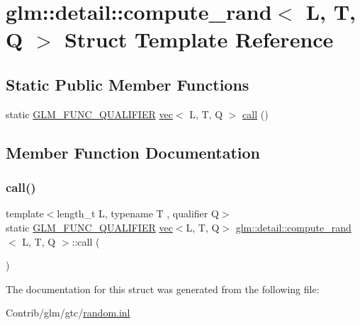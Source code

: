 \hypertarget{structglm_1_1detail_1_1compute__rand}{}\section{glm\+:\+:detail\+:\+:compute\+\_\+rand$<$ L, T, Q $>$ Struct Template Reference}
\label{structglm_1_1detail_1_1compute__rand}
\subsection*{Static Public Member Functions}
\begin{DoxyCompactItemize}
\item 
static \mbox{\hyperlink{setup_8hpp_a33fdea6f91c5f834105f7415e2a64407}{G\+L\+M\+\_\+\+F\+U\+N\+C\+\_\+\+Q\+U\+A\+L\+I\+F\+I\+ER}} \mbox{\hyperlink{structglm_1_1vec}{vec}}$<$ L, T, Q $>$ \mbox{\hyperlink{structglm_1_1detail_1_1compute__rand_a7c4855eeb77b83d066abf7ffc1398724}{call}} ()
\end{DoxyCompactItemize}


\subsection{Member Function Documentation}
\mbox{\label{structglm_1_1detail_1_1compute__rand_a7c4855eeb77b83d066abf7ffc1398724}} 
\subsubsection{\texorpdfstring{call()}{call()}}
{\footnotesize\ttfamily template$<$length\+\_\+t L, typename T , qualifier Q$>$ \\
static \mbox{\hyperlink{setup_8hpp_a33fdea6f91c5f834105f7415e2a64407}{G\+L\+M\+\_\+\+F\+U\+N\+C\+\_\+\+Q\+U\+A\+L\+I\+F\+I\+ER}} \mbox{\hyperlink{structglm_1_1vec}{vec}}$<$L, T, Q$>$ \mbox{\hyperlink{structglm_1_1detail_1_1compute__rand}{glm\+::detail\+::compute\+\_\+rand}}$<$ L, T, Q $>$\+::call (\begin{DoxyParamCaption}{ }\end{DoxyParamCaption})\hspace{0.3cm}{\ttfamily [static]}}



The documentation for this struct was generated from the following file\+:\begin{DoxyCompactItemize}
\item 
Contrib/glm/gtc/\mbox{\hyperlink{random_8inl}{random.\+inl}}\end{DoxyCompactItemize}
